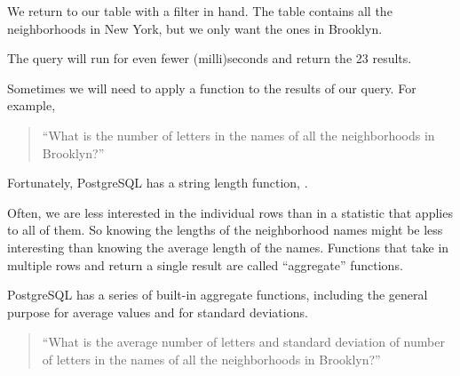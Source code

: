 \documentclass[a4paper,11pt,english]{sphinxmanual}
\begin{document}
We return to our  table with a filter in hand.  The table contains all the neighborhoods in New York, but we only want the ones in Brooklyn.

\begin{sphinxVerbatim}[commandchars=\\\{\}]
 
   
     
\end{sphinxVerbatim}

The query will run for even fewer (milli)seconds and return the 23 results.

Sometimes we will need to apply a function to the results of our query. For example,
\begin{quote}

“What is the number of letters in the names of all the neighborhoods in Brooklyn?”
\end{quote}

Fortunately, PostgreSQL has a string length function, .

\begin{sphinxVerbatim}[commandchars=\\\{\}]
 
   
     
\end{sphinxVerbatim}

Often, we are less interested in the individual rows than in a statistic that applies to all of them. So knowing the lengths of the neighborhood names might be less interesting than knowing the average length of the names. Functions that take in multiple rows and return a single result are called “aggregate” functions.

PostgreSQL has a series of built-in aggregate functions, including the general purpose  for average values and  for standard deviations.
\begin{quote}

“What is the average number of letters and standard deviation of number of letters in the names of all the neighborhoods in Brooklyn?”
\end{quote}
\end{document}
